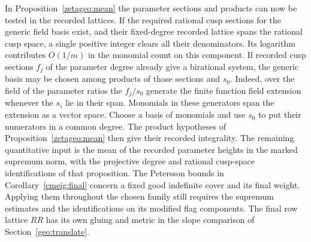 In Proposition~\ref{zetageo:mean} the parameter sections and
products can now be tested in the recorded lattices. If the required
rational cusp sections for the generic field basis exist, and their
fixed-degree recorded lattice spans the rational cusp space, a
single positive integer clears all their denominators. Its logarithm
contributes \(O(1/m)\) in the monomial count on this component.
If recorded cusp sections \(f_j\) of the parameter degree already
give a birational system, the generic basis may be chosen among
products of those sections and \(s_0\). Indeed, over the field of
the parameter ratios the \(f_j/s_0\) generate the finite function
field extension whenever the \(s_i\) lie in their span.
Monomials in these generators span the extension as a vector space.
Choose a basis of monomials and use \(s_0\) to put their numerators
in a common degree. The product hypotheses of
Proposition~\ref{zetageo:mean} then give their recorded integrality.
The remaining quantitative input is the mean of the recorded
parameter heights in the marked supremum norm, with the projective
degree and rational cusp-space identifications of that proposition.
The Petersson bounds in Corollary~\ref{cmeig:final} concern a fixed
good indefinite cover and its final weight. Applying them throughout
the chosen family still requires the supremum estimates and the
identifications on its modified flag components. The final row lattice
\(RR\) has its own gluing and metric in the slope comparison of
Section~\ref{geo:translate}.
